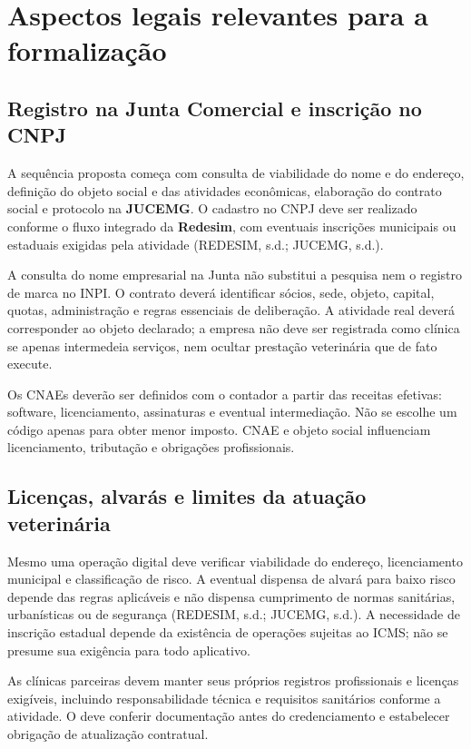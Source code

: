 \section{Aspectos legais relevantes para a formalização}
\label{sec:legal}
\subsection{Registro na Junta Comercial e inscrição no CNPJ}
A sequência proposta começa com consulta de viabilidade do nome e do endereço, definição do objeto social e das atividades econômicas, elaboração do contrato social e protocolo na \textbf{JUCEMG}. O cadastro no CNPJ deve ser realizado conforme o fluxo integrado da \textbf{Redesim}, com eventuais inscrições municipais ou estaduais exigidas pela atividade (REDESIM, s.d.; JUCEMG, s.d.).

A consulta do nome empresarial na Junta não substitui a pesquisa nem o registro de marca no INPI. O contrato deverá identificar sócios, sede, objeto, capital, quotas, administração e regras essenciais de deliberação. A atividade real deverá corresponder ao objeto declarado; a empresa não deve ser registrada como clínica se apenas intermedeia serviços, nem ocultar prestação veterinária que de fato execute.

Os CNAEs deverão ser definidos com o contador a partir das receitas efetivas: software, licenciamento, assinaturas e eventual intermediação. Não se escolhe um código apenas para obter menor imposto. CNAE e objeto social influenciam licenciamento, tributação e obrigações profissionais.

\subsection{Licenças, alvarás e limites da atuação veterinária}
Mesmo uma operação digital deve verificar viabilidade do endereço, licenciamento municipal e classificação de risco. A eventual dispensa de alvará para baixo risco depende das regras aplicáveis e não dispensa cumprimento de normas sanitárias, urbanísticas ou de segurança (REDESIM, s.d.; JUCEMG, s.d.). A necessidade de inscrição estadual depende da existência de operações sujeitas ao ICMS; não se presume sua exigência para todo aplicativo.

As clínicas parceiras devem manter seus próprios registros profissionais e licenças exigíveis, incluindo responsabilidade técnica e requisitos sanitários conforme a atividade. O \projeto{} deve conferir documentação antes do credenciamento e estabelecer obrigação de atualização contratual.

